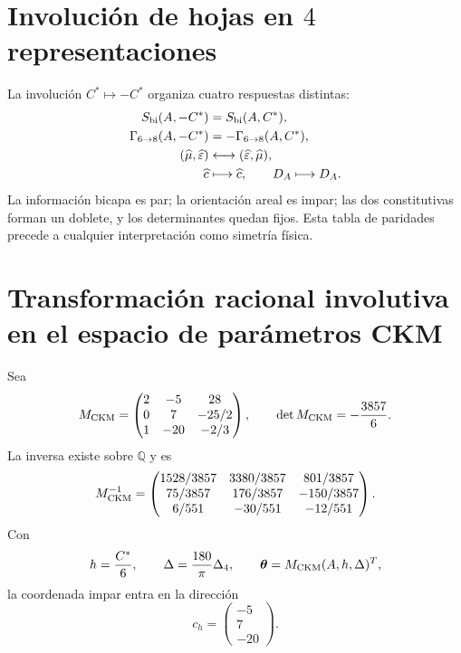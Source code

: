 \section{Involución de hojas en \(4\) representaciones}

La involuci\'on \(C^*\mapsto-C^*\) organiza cuatro respuestas distintas:
\begin{equation}
\label{rm:eq:modular-sheet-parities}
\begin{aligned}
S_{\rm bi}(A,-C^*)&=S_{\rm bi}(A,C^*),\\
\Gamma_{6\to8}(A,-C^*)&=-\Gamma_{6\to8}(A,C^*),\\
(\widehat\mu,\widehat\varepsilon)&\longleftrightarrow
(\widehat\varepsilon,\widehat\mu),\\
\widehat c&\longmapsto\widehat c,
\qquad D_A\longmapsto D_A.
\end{aligned}
\end{equation}
La informaci\'on bicapa es par; la orientaci\'on areal es impar; las dos
constitutivas forman un doblete, y los determinantes quedan fijos. Esta tabla
de paridades precede a cualquier interpretaci\'on como simetr\'ia f\'isica.

\section{Transformaci\'on racional involutiva en el espacio de par\'ametros CKM}

Sea
\begin{equation}
\label{rm:eq:modular-Mckm}
M_{\rm CKM}=
\begin{pmatrix}
2&-5&28\\
0&7&-25/2\\
1&-20&-2/3
\end{pmatrix},
\qquad
\det M_{\rm CKM}=-\frac{3857}{6}.
\end{equation}
La inversa existe sobre \(\mathbb Q\) y es
\begin{equation}
\label{rm:eq:modular-Mckm-inverse}
M_{\rm CKM}^{-1}=
\begin{pmatrix}
1528/3857&3380/3857&801/3857\\
75/3857&176/3857&-150/3857\\
6/551&-30/551&-12/551
\end{pmatrix}.
\end{equation}
Con
\begin{equation}
\label{rm:eq:modular-ckm-coordinates}
h=\frac{C^*}{6},
\qquad
\Delta=\frac{180}{\pi}\Delta_4,
\qquad
\boldsymbol\theta=M_{\rm CKM}(A,h,\Delta)^T,
\end{equation}
la coordenada impar entra en la direcci\'on
\begin{equation}
\label{rm:eq:modular-ch}
c_h=\begin{pmatrix}-5\\7\\-20\end{pmatrix}.
\end{equation}

